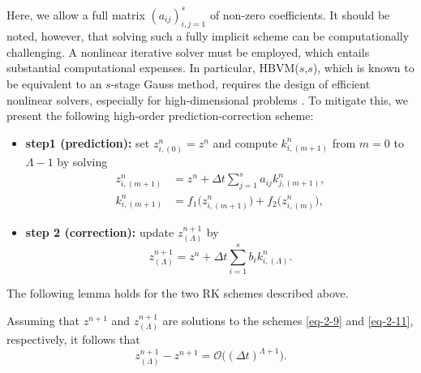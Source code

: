 \documentclass[onefignum,onetabnum]{siamart}
\begin{document}
Here, we allow a full matrix $(a_{ij})_{i,j=1}^s$ of non-zero coefficients. It should be noted, however, that solving such a fully implicit scheme can be computationally challenging. A nonlinear iterative solver must be employed, which entails substantial computational expenses. In particular, HBVM($s$,$s$), which is known to be equivalent to an $s$-stage Gauss method, requires the design of efficient nonlinear solvers, especially for high-dimensional problems \cite{luigi-11-efficient-HBVM-JCAM}. To mitigate this, we present the following high-order prediction-correction scheme: 
\begin{itemize}
	\item[{\textbf{$\star$}}]\textbf{step1 (prediction):} set $z_{i,(0)}^n=z^n$ and compute $k_{i,(m+1)}^n$ from $m=0$ to $\Lambda-1$ by solving
	\begin{equation}\label{eq-2-10}
	\begin{aligned}
		z_{i,(m+1)}^n&=z^n+\Delta t\sum_{j=1}^sa_{ij}k_{j,(m+1)}^n,\\ k_{i,(m+1)}^n&=f_1\big(z_{i,(m+1)}^n\big)+f_2\big(z_{i,(m)}^n\big),
		\end{aligned}
	\end{equation}
	\item[{\textbf{$\star$}}]\textbf{step 2 (correction):} update $z_{(\Lambda)}^{n+1}$ by
	\begin{equation}\label{eq-2-11}
		z_{(\Lambda)}^{n+1}=z^n+\Delta t\sum_{i=1}^sb_ik_{i,(\Lambda)}^n.
	\end{equation}
\end{itemize}
\noindent The following lemma holds for the two RK schemes described above.
\begin{lemma}\label{Le-2-3}
Assuming that $z^{n+1}$ and $z_{(\Lambda)}^{n+1}$ are solutions to the schemes \eqref{eq-2-9} and \eqref{eq-2-11}, respectively, it follows that
\begin{equation}\label{eq-2-12}
	z_{(\Lambda)}^{n+1}-z^{n+1}=\mathcal{O}\big((\Delta t)^{\Lambda+1}\big).
\end{equation} 
\end{lemma} 
\end{document}
